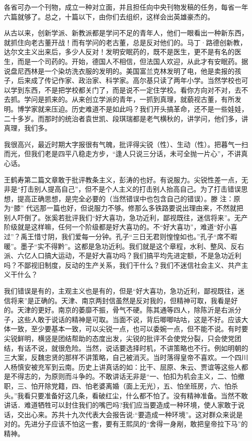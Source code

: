 各省可办一个刊物，成立一种对立面，并且担任向中央刊物发稿的任务，每省一年六篇就够了。总之，十篇以下，由你们去组织，这样会出英雄豪杰的。

从古以来，创新学派、新教派都是学问不足的青年人，他们一眼看出一种新东西，就抓住向老古董开战！而有学问的老古董，总是反对他们的。马丁·路德创新教，达尔文主义出来后，多少人反对！发明安眠药的，既不是医生，更不是有名的医生，而是一个司药的。开始，德国人不相信，但法国人欢迎，从此才有安眠药。据说盘尼西林是一个染坊洗衣服的发明的。美国富兰克林发明了电，他是卖报的孩子，后来成了传记作家、政治家、科学家。高尔基只读了两年小学。当然学校也可以学到东西，不是把学校都关门了，而是说不一定住学校。看你方向对不对，去不去抓。学问是抓来的。从来创立学派的青年，一抓到真理，就藐视古董，有所发明。博学家就来压迫。历史难道不是如此吗？我们开头搞革命，还不是一些娃娃，二十多岁。而那时的统治者袁世凯、段琪瑞都是老气横秋的，讲学问，他们多，讲真理，我们多。

我很高兴，最近时期大字报很有气魄，批评得尖锐（性）、生动（性）。把暮气一扫而光，但我们老是四平八稳走方步，“逢人只说三分话，未可全抛一片心”，不讲真心话。

王鹤寿第二篇文章敢于批评教条主义，彭涛的也好。有说服力。尖锐性差一点，无非是“打击别人提高自己”，但不是个人主义的打击别人抬高自己。为了打击错误思想，提高正确思想，是完全必要的（当然错误中也包含自己的错误）。滕 注：原为“膝” 代远那一篇也好，但说服力不够。修那么多铁路要说出理由来，不然就把别人吓倒了。张奚若批评我们“好大喜功，急功近利，鄙视既往，迷信将来”。无产阶级就是这样嘛，任何一个阶级都是好大喜功的。不“好大喜功”，难道“好小喜过”？禹王惜寸阴，我们爱每一分钟。孔子“三日无君则惶惶如也。”孔子“席不暇暖”。墨子“实不得黔”。这都是急功近利。我们就是这个章程，水利、整风、反右派、六亿人口搞大运动，不是好大喜功吗？我们搞平均先进定额，不是急功近利吗？不鄙视旧制度，反动的生产关系，我们干什么？我们不迷信社会主义、共产主义干什么？

我们错误是有的，主观主义也是有的，但是“好大喜功，急功近利，鄙视既往，迷信将来”是正确的。天津、南京两封信虽然是反对我的，但精神可取，我看是好的。天津的更好。南京的萎靡不振，骨气不硬。陈其通等四人，除陈沂是右派分子，这些人敢于说话的精神是可取。当面不说，背后唧唧咕咕，这是不好。应该大体一致，至少要基本一致，可以尖锐一点，也可以委婉一点，但不能不说。有时要尖锐鲜明，横竖是团结帮助的态度出发，尖锐的批评不会使党分裂，只会使党团结，有话不说，就很危险。当然，说话要选择时机，不讲策略也不行。例如明朝的三大案，反魏忠贤的那样不讲策略，自己被消灭。当时落得皇帝不喜欢。一个四川人杨慎安被充军到云南。历史上讲真话的如：比干、屈原、朱云、贾谊等这些人都是不得志的，为原则而斗争的。不敢讲话无非是“一、怕扣为机会主义，二、怕撤职，三、怕开除党籍，四、怕老婆离婚（面上无光），五、怕坐班房，六、怕杀头。”我看只要准备好这几条，看破红尘，什么都不怕了。没有精神准备。当然不敢讲话．难道牺牲可以封住我们的嘴巴吗?我们应当要造成一种环境，使人家敢于说话，交出心来。苏共十九次代表大会报告说:“要造成一种环境”。这对群众来说是对的。先进分子应该不怕这一套，要有王熙凤的“舍得一身剐，敢把皇帝拉下马”的精神。

